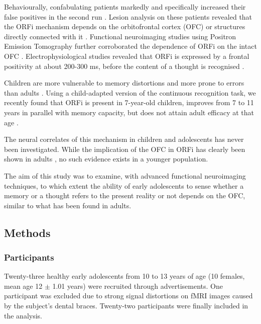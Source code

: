 Behaviourally, confabulating patients markedly and specifically increased their false positives in the second run \citep{Nahum2012, Schnider1999}. Lesion analysis on these patients revealed that the ORFi mechanism depends on the orbitofrontal cortex (OFC) or structures directly connected with it \citep{Schnider1996, Schnider2018}. Functional neuroimaging studies using Positron Emission Tomography further corroborated the dependence of ORFi on the intact OFC  \citep{Schnider2000,Treyer2003,Treyer2006}. Electrophysiological studies revealed that ORFi is expressed by a frontal positivity at about 200-300 ms, before the content of a thought is recognised \citep{Schnider2002}.

Children are more vulnerable to memory distortions and more prone to errors than adults \citep{Ceci1993}. Using a child-adapted version of the continuous recognition task, we recently found that ORFi is present in 7-year-old children, improves from 7 to 11 years in parallel with memory capacity, but does not attain adult efficacy at that age \citep{Liverani2017}.

The neural correlates of this mechanism in children and adolescents has never been investigated. While the implication of the OFC in ORFi has clearly been shown in adults \citep{Treyer2003,Treyer2006}, no such evidence exists in a younger population. 

The aim of this study was to examine, with advanced functional neuroimaging techniques, to which extent the ability of early adolescents to sense whether a memory or a thought refers to the present reality or not depends on the OFC, similar to what has been found in adults. 


\subsection{Methods}

\subsubsection{Participants} \label{subsection:OFC_participants}
Twenty-three healthy early adolescents from 10 to 13 years of age (10 females, mean age 12 $\pm$ 1.01 years) were recruited through advertisements. One participant was excluded due to strong signal distortions on fMRI images caused by the subject’s dental braces.  Twenty-two participants were finally included in the analysis.

